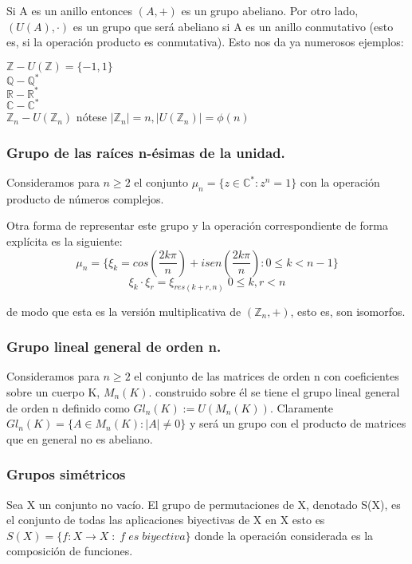 \documentclass{article}
\theoremstyle{theorem-style}  %
\theoremstyle{definition-style}
\theoremstyle{example-style}
\begin{document}
Si A es un anillo entonces $(A,+)$ es un grupo abeliano. Por otro lado, $(U(A),\cdot)$ es un grupo que será abeliano si A es un anillo conmutativo (esto es, si la operación producto es conmutativa). Esto nos da ya numerosos ejemplos:

$\mathbb{Z}-U(\mathbb{Z})=\{-1,1\}$ \\
$\mathbb{Q}-\mathbb{Q}^{*}$ \\
$\mathbb{R}-\mathbb{R}^{*}$ \\
$\mathbb{C}-\mathbb{C}^{*}$ \\
$\mathbb{Z}_n-U(\mathbb{Z}_n)$ nótese $|\mathbb{Z}_n| = n,|U(\mathbb{Z}_n)| = \phi(n)$ 

\subsubsection{Grupo de las raíces n-ésimas de la unidad.}

Consideramos para $n \ge 2$ el conjunto $\mu_n = \{z \in \mathbb{C}^{*} : z^n = 1\}$ con la operación producto de números complejos. 

Otra forma de representar este grupo y la operación correspondiente de forma explícita es la siguiente:
$$\mu_n = \{\xi_k = cos(\frac{2k\pi}{n})+isen(\frac{2k\pi}{n}) : 0 \le k < n-1 \}$$
$$\xi_k \cdot \xi_r = \xi_{res(k+r,n)} \; 0 \le k,r < n$$

de modo que esta es la versión multiplicativa de $(\mathbb{Z}_n,+)$, esto es, son isomorfos.

\subsubsection{Grupo lineal general de orden n.}

Consideramos para $n \ge 2$ el conjunto de las matrices de orden n con coeficientes sobre un cuerpo K, $M_n(K)$. construido sobre él se tiene el grupo lineal general de orden n definido como $Gl_n(K) := U(M_n(K))$. Claramente $Gl_n(K) = \{A \in M_n(K) : |A| \neq 0\}$ y será un grupo con el producto de matrices que en general no es abeliano.

\subsubsection{Grupos simétricos}

Sea X un conjunto no vacío. El grupo de permutaciones de X, denotado S(X), es el conjunto de todas las aplicaciones biyectivas de X en X esto es $S(X) = \{f:X \rightarrow X \; : \; f \; es \; biyectiva\}$ donde la operación considerada es la composición de funciones.
\end{document}
